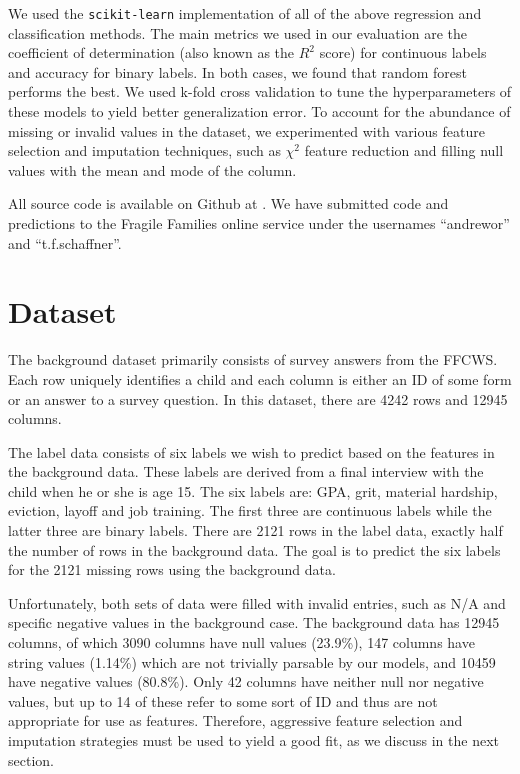 \documentclass{article} %
\begin{document}
We used the \texttt{scikit-learn} \cite{scikitlearn} implementation of all of the above regression and classification methods. The main metrics we used in our evaluation are the coefficient of determination (also known as the $R^2$ score) for continuous labels and accuracy for binary labels. In both cases, we found that random forest performs the best. We used k-fold cross validation to tune the hyperparameters of these models to yield better generalization error. To account for the abundance of missing or invalid values in the dataset, we experimented with various feature selection and imputation techniques, such as $\chi^2$ feature reduction and filling null values with the mean and mode of the column.

All source code is available on Github at \cite{myrepo}. We have submitted code and predictions to the Fragile Families online service under the usernames ``andrewor'' and ``t.f.schaffner''.

\section{Dataset}
\label{sec:dataset}

The background dataset primarily consists of survey answers from the FFCWS. Each row uniquely identifies a child and each column is either an ID of some form or an answer to a survey question. In this dataset, there are 4242 rows and 12945 columns.

The label data consists of six labels we wish to predict based on the features in the background data. These labels are derived from a final interview with the child when he or she is age 15. The six labels are: GPA, grit, material hardship, eviction, layoff and job training. The first three are continuous labels while the latter three are binary labels. There are 2121 rows in the label data, exactly half the number of rows in the background data. The goal is to predict the six labels for the 2121 missing rows using the background data.

Unfortunately, both sets of data were filled with invalid entries, such as N/A and specific negative values in the background case. The background data has 12945 columns, of which 3090 columns have null values (23.9\%), 147 columns have string values (1.14\%) which are not trivially parsable by our models, and 10459 have negative values (80.8\%). Only 42 columns have neither null nor negative values, but up to 14 of these refer to some sort of ID and thus are not appropriate for use as features. Therefore, aggressive feature selection and imputation strategies must be used to yield a good fit, as we discuss in the next section. 
\end{document}
